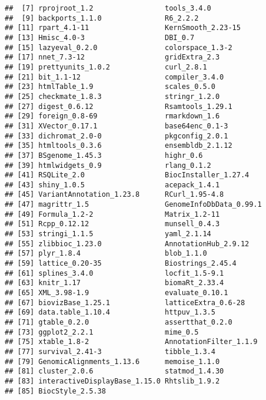 \documentclass{report}\usepackage[]{graphicx}\usepackage[usenames,dvipsnames]{color}
\newenvironment{knitrout}{}{} %
\begin{document}
\begin{knitrout}
\begin{kframe}
\begin{verbatim}
##  [7] rprojroot_1.2                 tools_3.4.0                  
##  [9] backports_1.1.0               R6_2.2.2                     
## [11] rpart_4.1-11                  KernSmooth_2.23-15           
## [13] Hmisc_4.0-3                   DBI_0.7                      
## [15] lazyeval_0.2.0                colorspace_1.3-2             
## [17] nnet_7.3-12                   gridExtra_2.3                
## [19] prettyunits_1.0.2             curl_2.8.1                   
## [21] bit_1.1-12                    compiler_3.4.0               
## [23] htmlTable_1.9                 scales_0.5.0                 
## [25] checkmate_1.8.3               stringr_1.2.0                
## [27] digest_0.6.12                 Rsamtools_1.29.1             
## [29] foreign_0.8-69                rmarkdown_1.6                
## [31] XVector_0.17.1                base64enc_0.1-3              
## [33] dichromat_2.0-0               pkgconfig_2.0.1              
## [35] htmltools_0.3.6               ensembldb_2.1.12             
## [37] BSgenome_1.45.3               highr_0.6                    
## [39] htmlwidgets_0.9               rlang_0.1.2                  
## [41] RSQLite_2.0                   BiocInstaller_1.27.4         
## [43] shiny_1.0.5                   acepack_1.4.1                
## [45] VariantAnnotation_1.23.8      RCurl_1.95-4.8               
## [47] magrittr_1.5                  GenomeInfoDbData_0.99.1      
## [49] Formula_1.2-2                 Matrix_1.2-11                
## [51] Rcpp_0.12.12                  munsell_0.4.3                
## [53] stringi_1.1.5                 yaml_2.1.14                  
## [55] zlibbioc_1.23.0               AnnotationHub_2.9.12         
## [57] plyr_1.8.4                    blob_1.1.0                   
## [59] lattice_0.20-35               Biostrings_2.45.4            
## [61] splines_3.4.0                 locfit_1.5-9.1               
## [63] knitr_1.17                    biomaRt_2.33.4               
## [65] XML_3.98-1.9                  evaluate_0.10.1              
## [67] biovizBase_1.25.1             latticeExtra_0.6-28          
## [69] data.table_1.10.4             httpuv_1.3.5                 
## [71] gtable_0.2.0                  assertthat_0.2.0             
## [73] ggplot2_2.2.1                 mime_0.5                     
## [75] xtable_1.8-2                  AnnotationFilter_1.1.9       
## [77] survival_2.41-3               tibble_1.3.4                 
## [79] GenomicAlignments_1.13.6      memoise_1.1.0                
## [81] cluster_2.0.6                 statmod_1.4.30               
## [83] interactiveDisplayBase_1.15.0 Rhtslib_1.9.2                
## [85] BiocStyle_2.5.38
\end{verbatim}
\end{kframe}
\end{knitrout}


\end{document}
